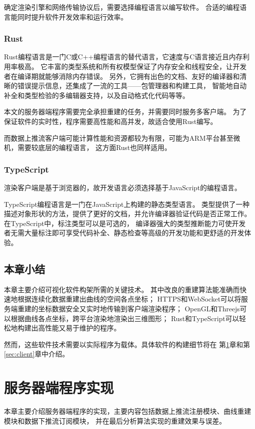 确定渲染引擎和网络传输协议后，需要选择编程语言以编写软件。
合适的编程语言能同时提升软件开发效率和运行效率。

\subsubsection{Rust}
Rust编程语言\cite{rust}是一门C或C++编程语言的替代语言，它速度与C语言接近且内存利用率极高。
它丰富的类型系统和所有权模型保证了内存安全和线程安全，让开发者在编译期就能够消除内存错误。
另外，它拥有出色的文档、友好的编译器和清晰的错误提示信息，还集成了一流的工具——包管理器和构建工具，
智能地自动补全和类型检验的多编辑器支持，以及自动格式化代码等等。

本文的服务器端程序需要完全承担重建的任务，并需要同时服务多客户端。
为了保证软件的实时性，程序需要高性能和高并发，故适合使用Rust编写。

而数据上推流客户端可能计算性能和资源都较为有限，可能为ARM平台甚至微机，需要较底层的编程语言，
这方面Rust也同样适用。

\subsubsection{TypeScript}
渲染客户端是基于浏览器的，故开发语言必须选择基于JavaScript的编程语言。

TypeScript编程语言\cite{typescript}是一门在JavaScript上构建的静态类型语言。
类型提供了一种描述对象形状的方法，提供了更好的文档，并允许编译器验证代码是否正常工作。
在TypeScript中，标注类型可以是可选的，
编译器强大的类型推断能力可使开发者无需大量标注即可享受代码补全、静态检查等高级的开发功能和更舒适的开发体验。

\subsection{本章小结}
本章主要介绍可视化软件构架所需的关键技术。
其中改良的重建算法能准确而快速地根据连续化数据重建出曲线的空间各点坐标；
HTTPS和WebSocket可以将服务端重建的坐标数据安全又实时地传输到客户端渲染程序；
OpenGL和Threejs可以根据曲线各点坐标，跨平台渲染地渲染出三维图形；
Rust和TypeScript可以轻松地构建出高性能又易于维护的程序。

然而，这些软件技术需要以实际程序为载体。具体软件的构建细节将在
第\ref{sec:server}章和第\ref{sec:client}章中介绍。

\clearpage

\section{服务器端程序实现}
\label{sec:server}
本章主要介绍服务器端程序的实现，主要内容包括数据上推流注册模块、曲线重建模块和数据下推流订阅模块，
并在最后分析算法实现的重建效果与误差。
 
